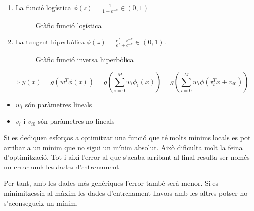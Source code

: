 \begin{enumerate}
	\item La funció logística $\phi(z) = \frac{1}{1 + e^{-z}} \in (0, 1)$
	\begin{figure}[H]
		\centering
		\caption{Gràfic funció logística}
		\label{fig:logistic}
	\end{figure}

	\item La tangent hiperbòlica $\phi(z) = \frac{e^z - e^{-z}}{e^z + e^{-z}} \in (0,1)$.
	
	\begin{figure}[H]
		\centering
		\caption{Gràfic funció inversa hiperbòlica}
		\label{fig:inv_hiperbol}
	\end{figure}
\end{enumerate}

$$
\implies y(x) = g(w^T \phi(x)) = g\left(\sum_{i=0}^M w_i \phi_i(x)\right) = g \left( \sum_{i=0}^M w_i \phi(v_i^T x + v_{i0}) \right)
$$
\begin{itemize}
	\item $w_i$ són paràmetres lineals
	\item $v_i$ i $v_{i0}$ són paràmetres no lineals
\end{itemize}


Si es dediquen esforços a optimitzar una funció que té molts mínims locals es pot arribar a un mínim que no sigui un mínim absolut. Això dificulta molt la feina d'optimització. Tot i així l'error al que s'acaba arribant al final resulta ser només un error amb les dades d'entrenament. 

Per tant, amb les dades més genèriques l'error també serà menor. Si es minimitzessin al màxim les dades d'entrenament llavors amb les altres potser no s'aconsegueix un mínim.


